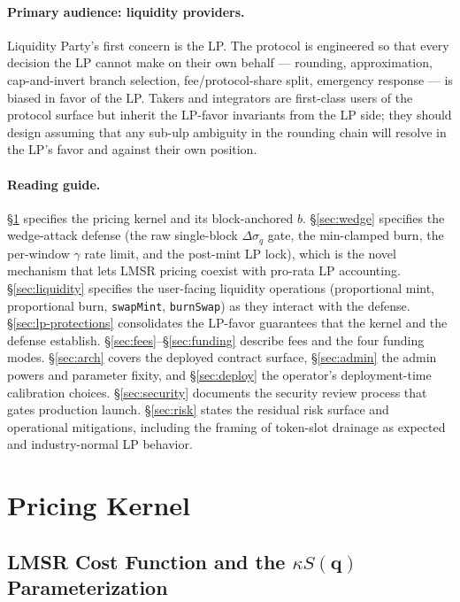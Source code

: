 \documentclass[11pt]{article}
\newcommand{\Sm}{S(\mathbf{q})}
\begin{document}
\paragraph{Primary audience: liquidity providers.}
Liquidity Party's first concern is the LP. The protocol is engineered so
that every decision the LP cannot make on their own behalf --- rounding,
approximation, cap-and-invert branch selection, fee/protocol-share split,
emergency response --- is biased in favor of the LP. Takers and integrators
are first-class users of the protocol surface but inherit the LP-favor
invariants from the LP side; they should design assuming that any
sub-ulp ambiguity in the rounding chain will resolve in the LP's favor
and against their own position.

\paragraph{Reading guide.}
\S\ref{sec:kernel} specifies the pricing kernel and its block-anchored
$b$. \S\ref{sec:wedge} specifies the wedge-attack defense (the
raw single-block $\Delta\sigma_q$ gate, the min-clamped burn, the
per-window $\gamma$ rate limit, and the post-mint LP lock), which is the novel
mechanism that lets LMSR pricing coexist with pro-rata LP accounting. \S\ref{sec:liquidity}
specifies the user-facing liquidity operations (proportional mint,
proportional burn, \texttt{swapMint}, \texttt{burnSwap}) as they
interact with the defense. \S\ref{sec:lp-protections} consolidates the
LP-favor guarantees that the kernel and the defense establish.
\S\ref{sec:fees}--\S\ref{sec:funding} describe fees and the four funding
modes. \S\ref{sec:arch} covers the deployed contract surface,
\S\ref{sec:admin} the admin powers and parameter fixity, and
\S\ref{sec:deploy} the operator's deployment-time calibration choices.
\S\ref{sec:security} documents the security review process that gates
production launch. \S\ref{sec:risk} states the residual risk surface and
operational mitigations, including the framing of token-slot drainage
as expected and industry-normal LP behavior.

\section{Pricing Kernel}
\label{sec:kernel}

\subsection{LMSR Cost Function and the $\kappa\Sm$ Parameterization}
\end{document}
